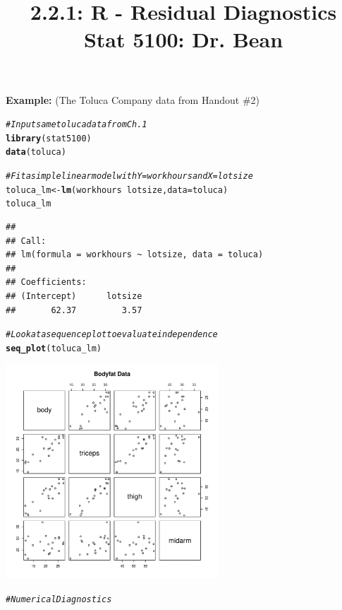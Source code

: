 \documentclass{article}\usepackage[]{graphicx}\usepackage[]{color}
\makeatletter
\newcommand{\hlcom}[1]{\textcolor[rgb]{0.678,0.584,0.686}{\textit{#1}}}%
\newcommand{\hlopt}[1]{\textcolor[rgb]{0,0,0}{#1}}%
\newcommand{\hlstd}[1]{\textcolor[rgb]{0.345,0.345,0.345}{#1}}%
\newcommand{\hlkwb}[1]{\textcolor[rgb]{0.69,0.353,0.396}{#1}}%
\newcommand{\hlkwc}[1]{\textcolor[rgb]{0.333,0.667,0.333}{#1}}%
\newcommand{\hlkwd}[1]{\textcolor[rgb]{0.737,0.353,0.396}{\textbf{#1}}}%
\newenvironment{kframe}{%
 \def\at@end@of@kframe{}%
 \ifinner\ifhmode%
  \def\at@end@of@kframe{\end{minipage}}%
  \begin{minipage}{\columnwidth}%
 \fi\fi%
 \def\FrameCommand##1{\hskip\@totalleftmargin \hskip-\fboxsep
 \colorbox{shadecolor}{##1}\hskip-\fboxsep
     \hskip-\linewidth \hskip-\@totalleftmargin \hskip\columnwidth}%
 \MakeFramed {\advance\hsize-\width
   \@totalleftmargin\z@ \linewidth\hsize
   \@setminipage}}%
 {\par\unskip\endMakeFramed%
 \at@end@of@kframe}
\newenvironment{knitrout}{}{} %
\makeatother
\begin{document}
\title{%
  2.2.1: R - Residual Diagnostics\\
  \smallskip
  \large Stat 5100: Dr. Bean
}
\date{}

\maketitle

\textbf{Example: } (The Toluca Company data from Handout \#2)

\begin{knitrout}
\color{fgcolor}\begin{kframe}
\begin{alltt}
\hlcom{# Input same toluca data from Ch. 1}
\hlkwd{library}\hlstd{(stat5100)}
\hlkwd{data}\hlstd{(toluca)}

\hlcom{# Fit a simple linear model with Y=workhours and X=lotsize}
\hlstd{toluca_lm} \hlkwb{<-} \hlkwd{lm}\hlstd{(workhours} \hlopt{~} \hlstd{lotsize,} \hlkwc{data} \hlstd{= toluca)}
\hlstd{toluca_lm}
\end{alltt}
\begin{verbatim}
## 
## Call:
## lm(formula = workhours ~ lotsize, data = toluca)
## 
## Coefficients:
## (Intercept)      lotsize  
##       62.37         3.57
\end{verbatim}
\begin{alltt}
\hlcom{# Look at a sequence plot to evaluate independence}
\hlkwd{seq_plot}\hlstd{(toluca_lm)}
\end{alltt}
\end{kframe}
\includegraphics[width=0.6\textwidth]{figure/unnamed-chunk-1-1} 
\begin{kframe}\begin{alltt}
\hlcom{# Numerical Diagnostics}


\end{alltt}
\end{kframe}
\end{knitrout}
\end{document}
